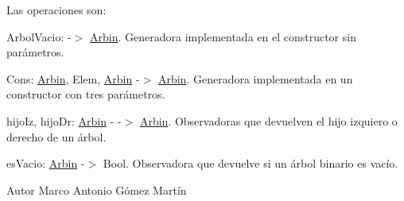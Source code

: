 \-Las operaciones son\-:


\begin{DoxyItemize}
\item \-Arbol\-Vacio\-: -\/$>$ \hyperlink{class_arbin}{\-Arbin}. \-Generadora implementada en el constructor sin parámetros.
\item \-Cons\-: \hyperlink{class_arbin}{\-Arbin}, \-Elem, \hyperlink{class_arbin}{\-Arbin} -\/$>$ \hyperlink{class_arbin}{\-Arbin}. \-Generadora implementada en un constructor con tres parámetros.
\item hijo\-Iz, hijo\-Dr\-: \hyperlink{class_arbin}{\-Arbin} -\/ -\/$>$ \hyperlink{class_arbin}{\-Arbin}. \-Observadoras que devuelven el hijo izquiero o derecho de un árbol.
\item es\-Vacio\-: \hyperlink{class_arbin}{\-Arbin} -\/$>$ \-Bool. \-Observadora que devuelve si un árbol binario es vacío.
\end{DoxyItemize}

\begin{DoxyAuthor}{\-Autor}
\-Marco \-Antonio \-Gómez \-Martín 
\end{DoxyAuthor}


